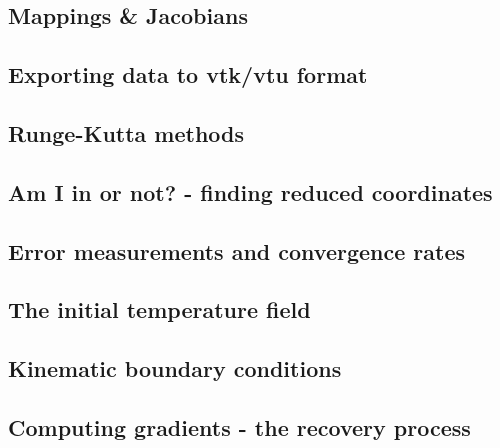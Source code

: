 \subsection{Mappings \& Jacobians \label{ss:mappings}}  %
\newpage %
\subsection{Exporting data to vtk/vtu format}  %
\newpage %
\subsection{Runge-Kutta methods}\label{ss:rkm}  %
\newpage %
\subsection{Am I in or not? - finding reduced coordinates}\label{sec:amiin} %
\newpage %
\subsection{Error measurements and convergence rates}  %
\newpage %
\subsection{The initial temperature field}  %
\newpage %
\subsection{Kinematic boundary conditions}\label{kin_bc}  %
\newpage %
\subsection{Computing gradients - the recovery process}  %
\newpage %
